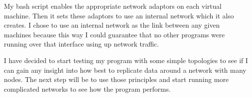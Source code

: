 \documentclass[12pt]{article}
\begin{document}
My bash script enables the appropriate network adaptors on
each virtual machine. Then it sets these adaptors to use an internal
network which it also creates. I chose to use an internal network
as the link between any given machines because this way I could
guarantee that no other programs were running over that interface
using up network traffic.

I have decided to start testing my program with
some simple topologies to see if I can gain any
insight into how best to replicate data around
a network with many nodes. The next step will
be to use those principles and start running
more complicated networks to see how the program
performs.
\end{document}
